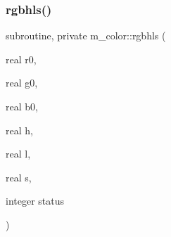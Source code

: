 \subsubsection{\texorpdfstring{rgbhls()}{rgbhls()}}
{\footnotesize\ttfamily subroutine, private m\+\_\+color\+::rgbhls (\begin{DoxyParamCaption}\item[{real}]{r0,  }\item[{real}]{g0,  }\item[{real}]{b0,  }\item[{real}]{h,  }\item[{real}]{l,  }\item[{real}]{s,  }\item[{integer}]{status }\end{DoxyParamCaption})\hspace{0.3cm}{\ttfamily [private]}}


